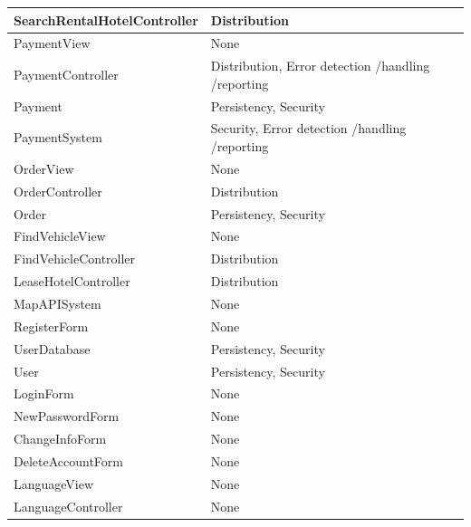 \begin{longtable}{|p{6cm}|p{9cm}|}
\hline
SearchRentalHotelController & Distribution \\
\hline
PaymentView & None \\
\hline
PaymentController & Distribution, Error detection /handling /reporting \\
\hline
Payment & Persistency, Security \\
\hline
PaymentSystem & Security, Error detection /handling /reporting \\
\hline
OrderView & None \\
\hline
OrderController & Distribution \\
\hline
Order & Persistency, Security \\
\hline
FindVehicleView & None \\
\hline
FindVehicleController & Distribution \\
\hline
LeaseHotelController & Distribution \\
\hline
MapAPISystem & None \\
\hline
RegisterForm & None \\
\hline
UserDatabase & Persistency, Security \\
\hline
User & Persistency, Security \\
\hline
LoginForm & None \\
\hline
NewPasswordForm & None \\
\hline
ChangeInfoForm & None \\
\hline
DeleteAccountForm & None \\
\hline
LanguageView & None \\
\hline
LanguageController & None \\
\hline
\end{longtable}